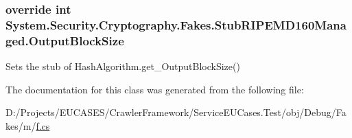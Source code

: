 \hypertarget{class_system_1_1_security_1_1_cryptography_1_1_fakes_1_1_stub_r_i_p_e_m_d160_managed_aacc205d10071e2e9e39074b0640a8983}{
\subsubsection[{Output\-Block\-Size}]{\setlength{\rightskip}{0pt plus 5cm}override int System.\-Security.\-Cryptography.\-Fakes.\-Stub\-R\-I\-P\-E\-M\-D160\-Managed.\-Output\-Block\-Size\hspace{0.3cm}{\ttfamily [get]}}}\label{class_system_1_1_security_1_1_cryptography_1_1_fakes_1_1_stub_r_i_p_e_m_d160_managed_aacc205d10071e2e9e39074b0640a8983}


Sets the stub of Hash\-Algorithm.\-get\-\_\-\-Output\-Block\-Size()



The documentation for this class was generated from the following file\-:\begin{DoxyCompactItemize}
\item 
D\-:/\-Projects/\-E\-U\-C\-A\-S\-E\-S/\-Crawler\-Framework/\-Service\-E\-U\-Cases.\-Test/obj/\-Debug/\-Fakes/m/\hyperlink{m_2f_8cs}{f.\-cs}\end{DoxyCompactItemize}
